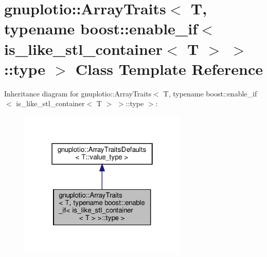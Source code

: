 \hypertarget{classgnuplotio_1_1ArrayTraits_3_01T_00_01typename_01boost_1_1enable__if_3_01is__like__stl__conta99f8c9e80e271bc1ed047cdd05794af4}{}\section{gnuplotio\+:\+:Array\+Traits$<$ T, typename boost\+:\+:enable\+\_\+if$<$ is\+\_\+like\+\_\+stl\+\_\+container$<$ T $>$ $>$\+:\+:type $>$ Class Template Reference}
\label{classgnuplotio_1_1ArrayTraits_3_01T_00_01typename_01boost_1_1enable__if_3_01is__like__stl__conta99f8c9e80e271bc1ed047cdd05794af4}


Inheritance diagram for gnuplotio\+:\+:Array\+Traits$<$ T, typename boost\+:\+:enable\+\_\+if$<$ is\+\_\+like\+\_\+stl\+\_\+container$<$ T $>$ $>$\+:\+:type $>$\+:
\nopagebreak
\begin{figure}[H]
\begin{center}
\leavevmode
\includegraphics[width=226pt]{classgnuplotio_1_1ArrayTraits_3_01T_00_01typename_01boost_1_1enable__if_3_01is__like__stl__conta5c9a0526d4b8f3b59efa70a3e03b094a}
\end{center}
\end{figure}


